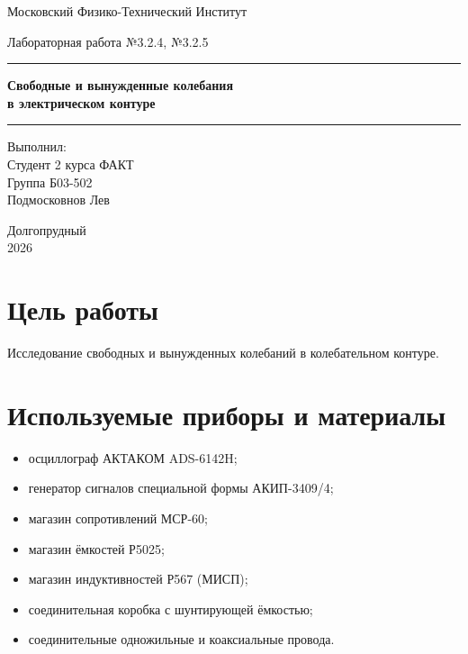 \documentclass[a4paper,14pt]{extarticle}
\begin{document}
\hypersetup{pageanchor=false}
\begin{titlepage}
\thispagestyle{empty}
\begin{center}
  \vspace*{0cm}
  {\normalsize Московский Физико-Технический Институт\par}
  \vspace{3cm}
  {\normalsize Лабораторная работа №3.2.4, №3.2.5\par}
  \vspace{0.65cm}
  \rule{\textwidth}{0.4pt}
  \vspace{0.30cm}
  {\bfseries\LARGE
    Свободные и вынужденные колебания\\
    в электрическом контуре\par}
  \vspace{0.34cm}
  \rule{\textwidth}{0.4pt}
\end{center}

\vspace{6.1cm}
\hfill
\begin{minipage}{0.42\textwidth}
  \raggedright
  Выполнил:\\
  Студент 2 курса ФАКТ\\
  Группа Б03-502\\
  Подмосковнов Лев
\end{minipage}

\vfill
\begin{center}
  Долгопрудный\\
  2026
\end{center}

\end{titlepage}

\hypersetup{pageanchor=true}
\setcounter{page}{1}

\section*{Цель работы}
Исследование свободных и вынужденных колебаний в колебательном контуре.

\section*{Используемые приборы и материалы}
\begin{itemize}
  \item осциллограф АКТАКОМ ADS-6142H;
  \item генератор сигналов специальной формы АКИП-3409/4;
  \item магазин сопротивлений МСР-60;
  \item магазин ёмкостей Р5025;
  \item магазин индуктивностей Р567 (МИСП);
  \item соединительная коробка с шунтирующей ёмкостью;
  \item соединительные одножильные и коаксиальные провода.
\end{itemize}
\end{document}
